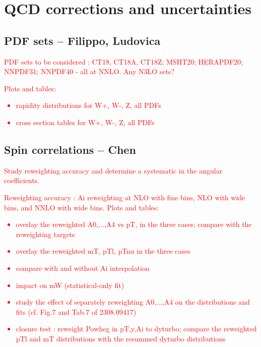 \chapter{QCD corrections and uncertainties}
\label{sec:modelingCorr}



\section{PDF sets -- Filippo, Ludovica}

\textcolor{red}{PDF sets to be considered : CT18, CT18A, CT18Z; MSHT20; HERAPDF20; NNPDF31; NNPDF40 - all at NNLO. Any N3LO sets?}

\textcolor{red}{Plots and tables:
\begin{itemize}
\item rapidity distributions for W+, W-, Z, all PDFs
\item cross section tables for W+, W-, Z, all PDFs
\end{itemize}}


\section{Spin correlations -- Chen}

\textcolor{red}{Study reweighting accuracy and determine a systematic in the angular coefficients.}

\textcolor{red}{Reweighting accuracy : Ai reweighting at NLO with fine bins, NLO with wide bins, and NNLO with wide bins. Plots and tables:
\begin{itemize}
\item overlay the reweighted A0,...,A4 vs pT, in the three cases; compare with the reweighting targets
\item overlay the reweighted mT, pTl, pTnu in the three cases
\item compare with and without Ai interpolation
\item impact on mW (statistical-only fit)
\item study the effect of separately reweighting A0,...,A4 on the distributions and fits (cf. Fig.7 and Tab.7 of 2308.09417)
\item closure test : reweight Powheg in pT,y,Ai to dyturbo; compare the reweighted pTl and mT distributions with the resummed dyturbo distributions
\end{itemize}}

